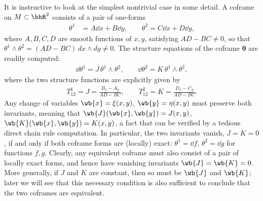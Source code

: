 \begin{example}
    It is instructive to look at the simplest nontrivial case in some detail. A coframe on $M \subset \bbR^2$ consists of a pair of one-forms
    \begin{align}
    \theta^1 &= A\dd x + B\dd y, \qquad \theta^2 = C\dd x + D\dd y,
    \end{align}
    where $A,B,C,D$ are smooth functions of $x,y$, satisfying $AD-BC \neq 0$, so that $\theta^1 \wedge \theta^2 = (AD-BC)\,dx \wedge dy \neq 0$. The structure equations of the coframe $\bm\theta$ are readily computed:
    \begin{align}
    \dd \theta^1 = J\, \theta^1 \wedge \theta^2, \qquad \dd \theta^2 = K\, \theta^1 \wedge \theta^2,
    \end{align}
    where the two structure functions are explicitly given by
    \begin{align}
    T_{12}^1 = J = \frac{B_x - A_y}{AD-BC}, \qquad T_{12}^2 = K = \frac{D_x - C_y}{AD-BC}.
    \end{align}
    Any change of variables $\wb{x} = \xi(x,y)$, $\wb{y} = \eta(x,y)$ must preserve both invariants, meaning that $\wb{J}(\wb{x},\wb{y}) = J(x,y)$, $\wb{K}(\wb{x},\wb{y}) = K(x,y)$, a fact that can be verified by a tedious direct chain rule computation. In particular, the two invariants vanish, $J = K = 0$, if and only if both coframe forms are (locally) exact: $\theta^1 = \dd f$, $\theta^2 = \dd g$ for functions $f,g$. Clearly, any equivalent coframe must also consist of a pair of locally exact forms, and hence have vanishing invariants $\wb{J} = \wb{K} = 0$. More generally, if $J$ and $K$ are constant, then so must be $\wb{J}$ and $\wb{K}$; later we will see that this necessary condition is also sufficient to conclude that the two coframes are equivalent.
\end{example}

\PRLsep

